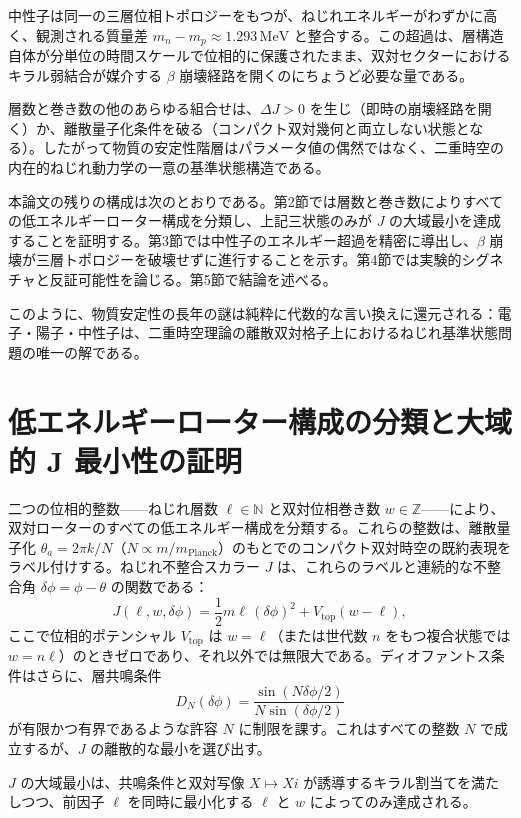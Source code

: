 \documentclass[a4paper]{article}
\begin{document}
中性子は同一の三層位相トポロジーをもつが、ねじれエネルギーがわずかに高く、観測される質量差 \(m_n-m_p\approx1.293\,\mathrm{MeV}\) と整合する。この超過は、層構造自体が分単位の時間スケールで位相的に保護されたまま、双対セクターにおけるキラル弱結合が媒介する \(\beta\) 崩壊経路を開くのにちょうど必要な量である。

層数と巻き数の他のあらゆる組合せは、\(\Delta J>0\) を生じ（即時の崩壊経路を開く）か、離散量子化条件を破る（コンパクト双対幾何と両立しない状態となる）。したがって物質の安定性階層はパラメータ値の偶然ではなく、二重時空の内在的ねじれ動力学の一意の基準状態構造である。

本論文の残りの構成は次のとおりである。第2節では層数と巻き数によりすべての低エネルギーローター構成を分類し、上記三状態のみが \(J\) の大域最小を達成することを証明する。第3節では中性子のエネルギー超過を精密に導出し、\(\beta\) 崩壊が三層トポロジーを破壊せずに進行することを示す。第4節では実験的シグネチャと反証可能性を論じる。第5節で結論を述べる。

このように、物質安定性の長年の謎は純粋に代数的な言い換えに還元される：電子・陽子・中性子は、二重時空理論の離散双対格子上におけるねじれ基準状態問題の唯一の解である。

\section{低エネルギーローター構成の分類と大域的 J 最小性の証明}

二つの位相的整数——ねじれ層数 \(\ell \in \mathbb{N}\) と双対位相巻き数 \(w \in \mathbb{Z}\)——により、双対ローターのすべての低エネルギー構成を分類する。これらの整数は、離散量子化 \(\theta_a = 2\pi k/N\)（\(N \propto m/m_\text{Planck}\)）のもとでのコンパクト双対時空の既約表現をラベル付けする。ねじれ不整合スカラー \(J\) は、これらのラベルと連続的な不整合角 \(\delta\phi = \phi - \theta\) の関数である：
\[
J(\ell,w,\delta\phi) = \frac12 m \ell \,(\delta\phi)^2 + V_\text{top}(w-\ell),
\]
ここで位相的ポテンシャル \(V_\text{top}\) は \(w=\ell\)（または世代数 \(n\) をもつ複合状態では \(w = n\ell\)）のときゼロであり、それ以外では無限大である。ディオファントス条件はさらに、層共鳴条件
\[
D_N(\delta\phi) = \frac{\sin(N\delta\phi/2)}{N\sin(\delta\phi/2)}
\]
が有限かつ有界であるような許容 \(N\) に制限を課す。これはすべての整数 \(N\) で成立するが、\(J\) の離散的な最小を選び出す。

\(J\) の大域最小は、共鳴条件と双対写像 \(X\mapsto Xi\) が誘導するキラル割当てを満たしつつ、前因子 \(\ell\) を同時に最小化する \(\ell\) と \(w\) によってのみ達成される。
\end{document}
